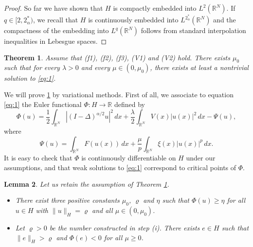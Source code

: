\documentclass[11pt]{amsart}
\numberwithin{equation}{section}
\newtheorem{theorem}{Theorem}[section]
\newtheorem{lemma}[theorem]{Lemma}
\theoremstyle{remark}
\theoremstyle{definition}
\begin{document}
\begin{proof}
	So far we have shown that $H$ is compactly embedded into $L^2(\mathbb{R}^N)$. If $q \in [2,2_\alpha^*)$, we recall that $H$ is continuously embedded into $L^{2_\alpha^*}(\mathbb{R}^N)$ and the compactness of the embedding into $L^q(\mathbb{R}^N)$ follows from standard interpolation inequalities in Lebesgue spaces.
\end{proof}
\begin{theorem} \label{th:2.3}
	Assume that (f1), (f2), (f3), (V1) and (V2) hold. There exists $\mu_0$ such that for every $\lambda>0$ and every $\mu \in (0,\mu_0)$, there exists at least a nontrivial solution to \eqref{eq:1}.
\end{theorem}
We will prove \ref{th:2.3} by variational methods. First of all, we associate to equation \eqref{eq:1} the Euler functional $\Phi \colon H \to \mathbb{R}$ defined by
\begin{equation} \label{eq:2.1}
\Phi (u) = \frac{1}{2} \int_{\mathbb{R}^N} \left| (I-\Delta)^{\alpha/2}u \right|^2 \, dx + \frac{\lambda}{2} \int_{\mathbb{R}^N} V(x) |u(x)|^2 \, dx - \Psi (u),
\end{equation}
where
\begin{equation*}
\Psi (u) = \int_{\mathbb{R}^N} F(u(x))\, dx + \frac{\mu}{p} \int_{\mathbb{R}^N} \xi(x) |u(x)|^{p} \, dx.
\end{equation*}
It is easy to check that $\Phi$ is continuously differentiable on $H$ under our assumptions, and that weak solutions to \eqref{eq:1} correspond to critical points of $\Phi$.
\begin{lemma} \label{lem:2.4}
  Let us retain the assumption of Theorem \ref{th:2.3}.
  \begin{itemize}
    \item[(i)] There exist three positive constants $\mu_0$, $\varrho$ and $\eta$ such that $\Phi(u) \geqslant \eta$ for all $u \in H$ with $\|u\|_H =\varrho$ and all $\mu \in (0,\mu_0)$.
    \item[(ii)] Let $\varrho>0$ be the number constructed in step (i). There exists $e \in H$ such that $\|e\|_H > \varrho$ and $\Phi(e) < 0$ for all $\mu \geqslant 0$.
\end{itemize}
\end{lemma}
\end{document}

